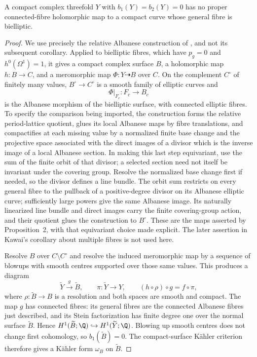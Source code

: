 
\begin{proposition}\label{cdp:st:C.3.7}

A compact complex threefold $Y$ with $b_1(Y)=b_2(Y)=0$ has no
proper connected-fibre holomorphic map to a compact curve whose
general fibre is bielliptic.
\end{proposition}
\begin{proof}
We use precisely the relative Albanese construction of
\cite[Proposition~2, pp.~605--608]{Kawai1969}, and not its subsequent
corollary. Applied to bielliptic fibres, which have
$p_g=0$ and $h^0(\Omega^1)=1$, it gives a compact complex surface
$B$, a holomorphic map $h:B\to C$, and a meromorphic map
$\Phi:Y\dashrightarrow B$ over $C$. On the complement $C^\circ$
of finitely many values, $B^\circ\to C^\circ$ is a smooth family
of elliptic curves and
\[
 \Phi|_{F_c}:F_c\longrightarrow B_c
\]
is the Albanese morphism of the bielliptic surface, with connected
elliptic fibres. To specify the comparison being imported, the
construction forms the relative period-lattice quotient, glues its
local Albanese maps by fibre translations, and compactifies at each
missing value by a normalized finite base change and the projective
space associated with the direct images of a divisor which is the
inverse image of a local Albanese section. In making this last
step equivariant, use the sum of the finite orbit of that divisor;
a selected section need not itself be invariant under the covering
group. Resolve the normalized base change first if needed, so the
divisor defines a line bundle. The orbit sum restricts on every
general fibre to the pullback of a positive-degree divisor on its
Albanese elliptic curve; sufficiently large powers give the same
Albanese image. Its naturally linearized line bundle and direct
images carry the finite covering-group action, and their quotient
glues the construction to $B^\circ$. These are the maps asserted by
Proposition~2, with that equivariant choice made explicit. The
later assertion in Kawai's corollary about multiple fibres is not
used here.

Resolve $B$ over $C\setminus C^\circ$ and resolve the induced
meromorphic map by a sequence of blowups with smooth centres
supported over those same values. This produces a diagram
\[
 \widetilde Y\xrightarrow{\ g\ }\widetilde B,
 \qquad \pi:\widetilde Y\longrightarrow Y,
 \qquad (h\circ\rho)\circ g=f\circ\pi,
\]
where $\rho:\widetilde B\to B$ is a resolution and both spaces
are smooth and compact. The map $g$ has connected fibres:
its general fibres are the connected Albanese fibres just described,
and its Stein factorization has finite degree one over the normal
surface $\widetilde B$. Hence
$H^1(\widetilde B;\Q)\hookrightarrow H^1(\widetilde Y;\Q)$.
Blowing up smooth centres does not change first cohomology, so
$b_1(\widetilde B)=0$. The compact-surface K\"ahler criterion
\cite[Theorem~1.1]{Peters1990} therefore gives a K\"ahler form
$\omega_B$ on $\widetilde B$.


\end{proof}
